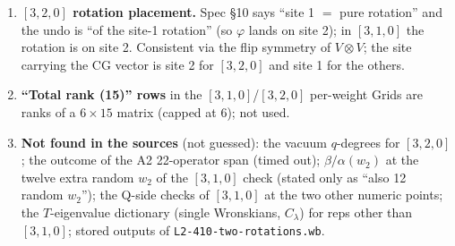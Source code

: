 \documentclass[11pt]{article}
\newcommand{\nb}[1]{\texttt{#1}}
\begin{document}
\begin{enumerate}
\item \textbf{$[3,2,0]$ rotation placement.} Spec \S10 says ``site 1 $=$ pure rotation'' and the undo is ``of the site-1 rotation'' (so $\varphi$ lands on site 2); in $[3,1,0]$ the rotation is on site 2. Consistent via the flip symmetry of $V\otimes V$; the site carrying the CG vector is site 2 for $[3,2,0]$ and site 1 for the others.
\item \textbf{``Total rank (15)'' rows} in the $[3,1,0]$/$[3,2,0]$ per-weight Grids are ranks of a $6\times15$ matrix (capped at 6); not used.
\item \textbf{Not found in the sources} (not guessed): the vacuum $q$-degrees for $[3,2,0]$; the outcome of the A2 22-operator span (timed out); $\beta/\alpha(w_2)$ at the twelve extra random $w_2$ of the $[3,1,0]$ check (stated only as ``also 12 random $w_2$''); the Q-side checks of $[3,1,0]$ at the two other numeric points; the $T$-eigenvalue dictionary (single Wronskians, $C_\lambda$) for reps other than $[3,1,0]$; stored outputs of \nb{L2-410-two-rotations.wb}.
\end{enumerate}
\end{document}
